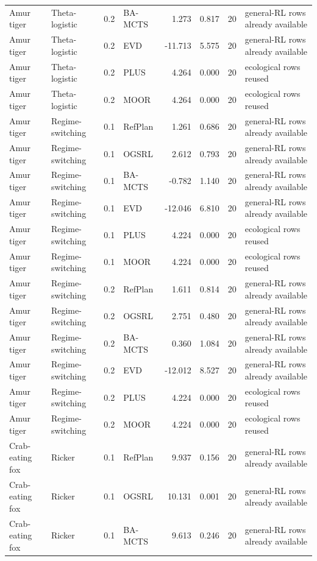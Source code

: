 \documentclass[10pt]{article}
\begin{document}
\begin{landscape}
\begin{center}
\begin{longtable}{@{}llclr rrp{5.2cm}@{}}
Amur tiger & Theta-logistic & 0.2 & BA-MCTS & 1.273 & 0.817 & 20 & general-RL rows already available \\
Amur tiger & Theta-logistic & 0.2 & EVD & -11.713 & 5.575 & 20 & general-RL rows already available \\
Amur tiger & Theta-logistic & 0.2 & PLUS & 4.264 & 0.000 & 20 & ecological rows reused \\
Amur tiger & Theta-logistic & 0.2 & MOOR & 4.264 & 0.000 & 20 & ecological rows reused \\
\addlinespace[1.5pt]
Amur tiger & Regime-switching & 0.1 & RefPlan & 1.261 & 0.686 & 20 & general-RL rows already available \\
Amur tiger & Regime-switching & 0.1 & OGSRL & 2.612 & 0.793 & 20 & general-RL rows already available \\
Amur tiger & Regime-switching & 0.1 & BA-MCTS & -0.782 & 1.140 & 20 & general-RL rows already available \\
Amur tiger & Regime-switching & 0.1 & EVD & -12.046 & 6.810 & 20 & general-RL rows already available \\
Amur tiger & Regime-switching & 0.1 & PLUS & 4.224 & 0.000 & 20 & ecological rows reused \\
Amur tiger & Regime-switching & 0.1 & MOOR & 4.224 & 0.000 & 20 & ecological rows reused \\
\addlinespace[1.5pt]
Amur tiger & Regime-switching & 0.2 & RefPlan & 1.611 & 0.814 & 20 & general-RL rows already available \\
Amur tiger & Regime-switching & 0.2 & OGSRL & 2.751 & 0.480 & 20 & general-RL rows already available \\
Amur tiger & Regime-switching & 0.2 & BA-MCTS & 0.360 & 1.084 & 20 & general-RL rows already available \\
Amur tiger & Regime-switching & 0.2 & EVD & -12.012 & 8.527 & 20 & general-RL rows already available \\
Amur tiger & Regime-switching & 0.2 & PLUS & 4.224 & 0.000 & 20 & ecological rows reused \\
Amur tiger & Regime-switching & 0.2 & MOOR & 4.224 & 0.000 & 20 & ecological rows reused \\
\addlinespace[1.5pt]
Crab-eating fox & Ricker & 0.1 & RefPlan & 9.937 & 0.156 & 20 & general-RL rows already available \\
Crab-eating fox & Ricker & 0.1 & OGSRL & 10.131 & 0.001 & 20 & general-RL rows already available \\
Crab-eating fox & Ricker & 0.1 & BA-MCTS & 9.613 & 0.246 & 20 & general-RL rows already available \\

\end{longtable}
\end{center}
\end{landscape}
\end{document}
